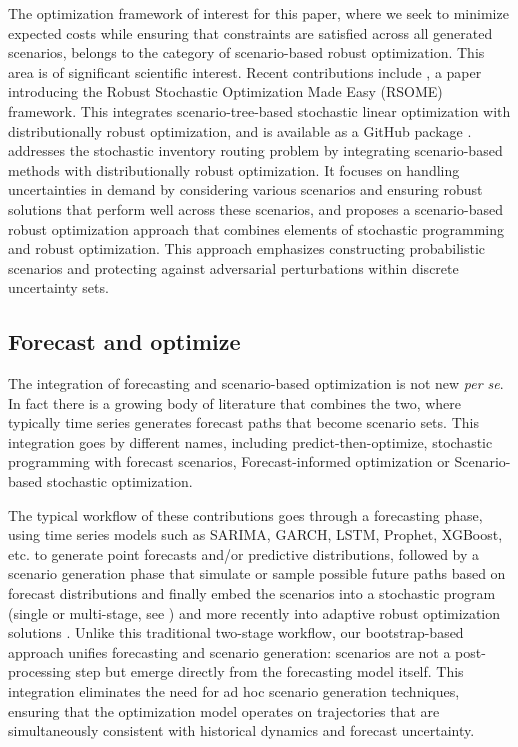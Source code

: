 \documentclass[opre,sglanonrev,11pt]{informs4}
\begin{document}
The optimization framework of interest for this paper, where we seek to minimize expected costs while ensuring that constraints are satisfied across all generated scenarios, belongs to the category of scenario-based robust optimization. This area is of significant scientific interest. Recent contributions include \cite{CSX20}, a paper introducing the Robust Stochastic Optimization Made Easy (RSOME) framework. This integrates scenario-tree-based stochastic linear optimization with distributionally robust optimization, and is available as a GitHub package \cite{CX23}. \cite{LCKZ23} addresses the stochastic inventory routing problem by integrating scenario-based methods with distributionally robust optimization. It focuses on handling uncertainties in demand by considering various scenarios and ensuring robust solutions that perform well across these scenarios, and \cite{WAJ23} proposes a scenario-based robust optimization approach that combines elements of stochastic programming and robust optimization. This approach emphasizes constructing probabilistic scenarios and protecting against adversarial perturbations within discrete uncertainty sets.

\subsection{Forecast and optimize}

The integration of forecasting and scenario-based optimization is not new {\it per se}. In fact there is a growing body of literature that combines the two, where typically time series generates forecast paths that become scenario sets.
This integration goes by different names, including predict-then-optimize, stochastic programming with forecast scenarios, Forecast-informed optimization or Scenario-based stochastic optimization.

The typical workflow of these contributions goes through a forecasting phase, using time series models such as SARIMA, GARCH, LSTM, Prophet, XGBoost, etc. to generate point forecasts and/or predictive distributions, followed by a scenario generation phase that simulate or sample possible future paths based on forecast distributions and finally embed the scenarios into a stochastic program (single or multi-stage, see \citealt{R18,FTW18,BK19}) and more recently into adaptive robust optimization solutions \citep{BB23}. Unlike this traditional two-stage workflow, our bootstrap-based approach unifies forecasting and scenario generation: scenarios are not a post-processing step but emerge directly from the forecasting model itself. This integration eliminates the need for ad hoc scenario generation techniques, ensuring that the optimization model operates on trajectories that are simultaneously consistent with historical dynamics and forecast uncertainty. 
\end{document}
